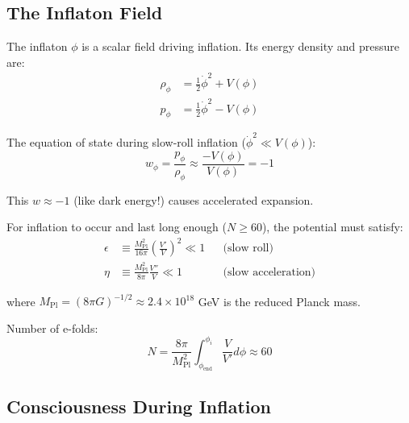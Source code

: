 \subsection{The Inflaton Field}

\begin{defn}[Inflaton]\label{def:inflaton}
The inflaton $\phi$ is a scalar field driving inflation. Its energy density and pressure are\cite{linde1982,albrecht1982}:
\begin{align}
\rho_\phi &= \frac{1}{2} \dot{\phi}^2 + V(\phi) \\
p_\phi &= \frac{1}{2} \dot{\phi}^2 - V(\phi)
\end{align}

The equation of state during slow-roll inflation ($\dot{\phi}^2 \ll V(\phi)$):
\begin{equation}
w_\phi = \frac{p_\phi}{\rho_\phi} \approx \frac{-V(\phi)}{V(\phi)} = -1
\end{equation}

This $w \approx -1$ (like dark energy!) causes accelerated expansion.
\end{defn}

\begin{proposition}\label{prop:slow-roll}
For inflation to occur and last long enough ($N \geq 60$), the potential must satisfy:
\begin{align}
\epsilon &\equiv \frac{M_{\text{Pl}}^2}{16\pi} \left( \frac{V'}{V} \right)^2 \ll 1 && \text{(slow roll)} \\
\eta &\equiv \frac{M_{\text{Pl}}^2}{8\pi} \frac{V''}{V} \ll 1 && \text{(slow acceleration)}
\end{align}

where $M_{\text{Pl}} = (8\pi G)^{-1/2} \approx 2.4 \times 10^{18}$ GeV is the reduced Planck mass.

Number of e-folds:
\begin{equation}
N = \frac{8\pi}{M_{\text{Pl}}^2} \int_{\phi_{\text{end}}}^{\phi_i} \frac{V}{V'} d\phi \approx 60
\end{equation}
\end{proposition}

\subsection{Consciousness During Inflation}

